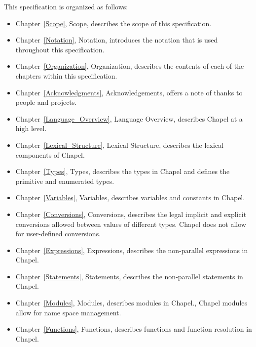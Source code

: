 \label{Organization}

This specification is organized as follows:
\begin{itemize}

\item
Chapter~\ref{Scope}, Scope, describes the scope of this specification.

\item
Chapter~\ref{Notation}, Notation, introduces the notation that is used
throughout this specification.

\item
Chapter~\ref{Organization}, Organization, describes the contents of
each of the chapters within this specification.

\item
Chapter~\ref{Acknowledgments}, Acknowledgements, offers a note of
thanks to people and projects.

\item
Chapter~\ref{Language_Overview}, Language Overview, describes Chapel
at a high level.

\item
Chapter~\ref{Lexical_Structure}, Lexical Structure, describes the
lexical components of Chapel.

\item
Chapter~\ref{Types}, Types, describes the types in Chapel and defines
the primitive and enumerated types.

\item
Chapter~\ref{Variables}, Variables, describes variables and constants
in Chapel.

\item
Chapter~\ref{Conversions}, Conversions, describes the legal implicit
and explicit conversions allowed between values of different types.
Chapel does not allow for user-defined conversions.

\item
Chapter~\ref{Expressions}, Expressions, describes the non-parallel
expressions in Chapel.

\item
Chapter~\ref{Statements}, Statements, describes the non-parallel
statements in Chapel.

\item
Chapter~\ref{Modules}, Modules, describes modules in Chapel., Chapel
modules allow for name space management.

\item
Chapter~\ref{Functions}, Functions, describes functions and function
resolution in Chapel.


\end{itemize}
